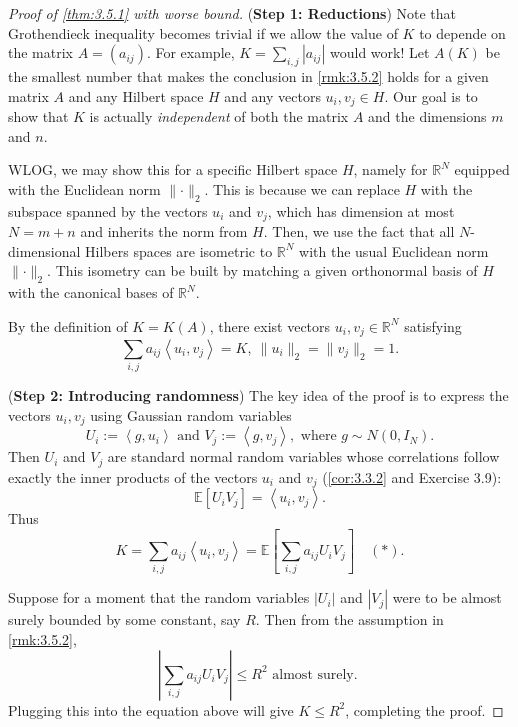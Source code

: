 \begin{proof}[Proof of \cref{thm:3.5.1} with worse bound]
(\textbf{Step 1: Reductions}) Note that Grothendieck inequality becomes trivial if we allow the value of $K$ to 
depende on the matrix $A = (a_{ij})$. For example, $K = \sum_{i, j}^{} |a_{ij}|$ would work! Let $A(K)$ be the 
smallest number that makes the conclusion in \cref{rmk:3.5.2} holds for a given matrix $A$ and any Hilbert 
space $H$ and any vectors $u_i, v_j \in H$. Our goal is to show that $K$ is actually \textit{independent} of 
both the matrix $A$ and the dimensions $m$ and $n$.

WLOG, we may show this for a specific Hilbert space $H$, namely for $\mathbb{R}^N$ equipped with the Euclidean 
norm $\lVert \cdot \rVert_{2}$. This is because we can replace $H$ with the subspace spanned by the vectors 
$u_i$ and $v_j$, which has dimension at most $N = m + n$ and inherits the norm from $H$. Then, we use the fact 
that all $N$-dimensional Hilbers spaces are isometric to $\mathbb{R}^N$ with the usual Euclidean norm 
$\lVert \cdot \rVert_{2}$. This isometry can be built by matching a given orthonormal basis of $H$ with the 
canonical bases of $\mathbb{R}^N$.

By the definition of $K = K(A)$, there exist vectors $u_i, v_j \in \mathbb{R}^N$ satisfying 
\[ \sum_{i, j}^{} a_{ij}\left\langle u_i, v_j \right\rangle = K, \ 
\lVert u_i \rVert_{2} = \lVert v_j \rVert_{2} = 1. \]

(\textbf{Step 2: Introducing randomness}) The key idea of the proof is to express the vectors $u_i, v_j$ 
using Gaussian random variables 
\[ U_i := \left\langle g, u_i \right\rangle \text{ and } V_j := \left\langle g, v_j \right\rangle, 
\text{ where } g \sim N(0, I_N). \]
Then $U_i$ and $V_j$ are standard normal random variables whose correlations follow exactly the inner products 
of the vectors $u_i$ and $v_j$ (\cref{cor:3.3.2} and Exercise 3.9):
\[ \mathbb{E}\left[ U_iV_j \right] = \left\langle u_i, v_j \right\rangle. \]
Thus 
\[ K = \sum_{i, j}^{}a_{ij} \left\langle u_i, v_j \right\rangle 
= \mathbb{E}\left[ \sum_{i, j}^{}a_{ij}U_iV_j \right] \quad (*). \]

Suppose for a moment that the random variables $|U_i|$ and $|V_j|$ were to be almost surely bounded by some 
constant, say $R$. Then from the assumption in \cref{rmk:3.5.2}, 
\[ \left| \sum_{i, j}^{} a_{ij}U_iV_j \right| \leq R^2 \text{ almost surely. } \]
Plugging this into the equation above will give $K \leq R^2$, completing the proof.


\end{proof}
